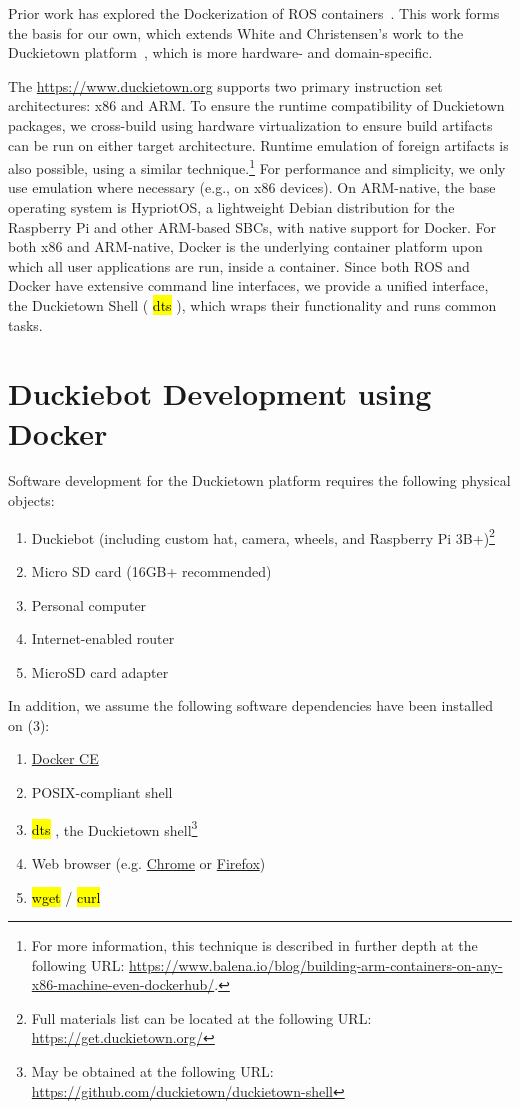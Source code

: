 \documentclass[12pt,initial,twoside,maitrise]{dms}
\newcommand{\inline}[1]{%
\begingroup%
\sethlcolor{slightgray}%
\hl{\ttfamily\small #1}%
\endgroup
}
\numberwithin{equation}{section}
\numberwithin{table}{chapter}
\numberwithin{figure}{chapter}
\begin{document}
Prior work has explored the Dockerization of ROS containers~\citep{white2017ros-docker}. This work forms the basis for our own, which extends White and Christensen's work to the Duckietown platform~\citep{paull2017duckietown}, which is more hardware- and domain-specific.

The \href{Duckietown platform}{https://www.duckietown.org} supports two primary instruction set architectures: x86 and ARM. To ensure the runtime compatibility of Duckietown packages, we cross-build using hardware virtualization to ensure build artifacts can be run on either target architecture. Runtime emulation of foreign artifacts is also possible, using a similar technique.\footnote{For more information, this technique is described in further depth at the following URL: \url{https://www.balena.io/blog/building-arm-containers-on-any-x86-machine-even-dockerhub/}.} For performance and simplicity, we only use emulation where necessary (e.g., on x86 devices). On ARM-native, the base operating system is HypriotOS, a lightweight Debian distribution for the Raspberry Pi and other ARM-based SBCs, with native support for Docker. For both x86 and ARM-native, Docker is the underlying container platform upon which all user applications are run, inside a container. Since both ROS and Docker have extensive command line interfaces, we provide a unified interface, the Duckietown Shell (\inline{dts}), which wraps their functionality and runs common tasks.

\section{Duckiebot Development using Docker}

\noindent Software development for the Duckietown platform requires the following physical objects:
%
\begin{enumerate}
    \item Duckiebot (including custom hat, camera, wheels, and Raspberry Pi 3B+)\footnote{Full materials list can be located at the following URL: \url{https://get.duckietown.org/}}
    \item Micro SD card (16GB+ recommended)
    \item Personal computer
    \item Internet-enabled router
    \item MicroSD card adapter
\end{enumerate}
%
In addition, we assume the following software dependencies have been installed on (3):
%
\begin{enumerate}[label=(\alph*)]
    \item \href{https://get.docker.com}{Docker CE}
    \item POSIX-compliant shell
    \item \inline{dts}, the Duckietown shell\footnote{May be obtained at the following URL: \url{https://github.com/duckietown/duckietown-shell}}
    \item Web browser (e.g. \href{https://www.google.com/chrome/}{Chrome} or \href{http://mozilla.org/firefox/}{Firefox})
    \item \inline{wget}/\inline{curl}
\end{enumerate}
\end{document}
